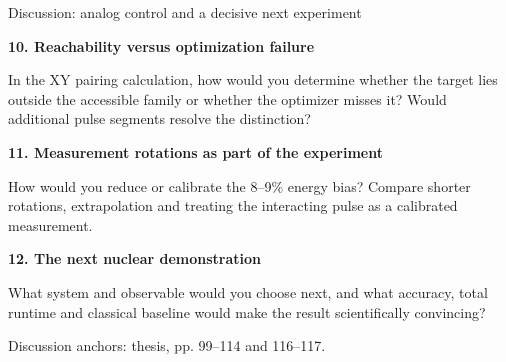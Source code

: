 \documentclass[11pt,aspectratio=169]{beamer}
\newcommand{\src}[1]{\par\vfill{\fontsize{7}{8}\selectfont\color{gray}#1\par}}
\newcommand{\question}[3]{\par\medskip\textbf{#1. #2}\par\smallskip #3\par}
\begin{document}
\begin{frame}{Discussion: analog control and a decisive next experiment}
\question{10}{Reachability versus optimization failure}{In the XY pairing calculation, how would you determine whether the target lies outside the accessible family or whether the optimizer misses it? Would additional pulse segments resolve the distinction?}
\question{11}{Measurement rotations as part of the experiment}{How would you reduce or calibrate the 8--9\% energy bias? Compare shorter rotations, extrapolation and treating the interacting pulse as a calibrated measurement.}
\question{12}{The next nuclear demonstration}{What system and observable would you choose next, and what accuracy, total runtime and classical baseline would make the result scientifically convincing?}
\src{Discussion anchors: thesis, pp. 99--114 and 116--117.}
\end{frame}
\end{document}
